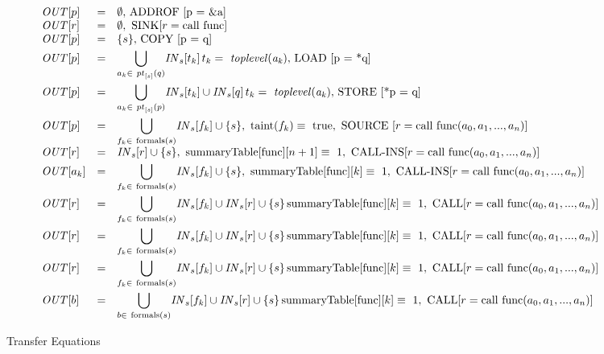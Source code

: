 \begin{figure*}
\[
\begin{array}{lcl}
	\myoutflow[p] & = & \emptyset,\   \addrofdef	\\
		
	\myoutflow[r] & = & \emptyset,\   \sinkdef	\\
			
	\myoutflow[p] & = & \set{s},\   \copydef	\\
				
	\myoutflow[p] & = & \mybigcup{a_k \in\ \pointsto{s}{q}}{} \myinflow{}_s[t_k]\, t_k =\ \mathit{toplevel(a_k)},\   \loaddef	\\		
			
	\myoutflow[p] & = & \mybigcup{a_k \in\ \pointsto{s}{p}}{} \myinflow{}_s[t_k] \cup \myinflow{}_s[q]\, t_k =\ \mathit{toplevel(a_k)},\
	   \storedef	\\
	   
	\myoutflow[p] & = & \mybigcup{f_k \in\ \text{formals}(s)}{} \myinflow{}_s[f_k] \cup \set{s},\ \text{taint}(f_k) \equiv\ 
	\text{true},\   \sourcedef	\\
	
	\myoutflow[r] & = & \myinflow{}_s[r] \cup \set{s},\ \text{summaryTable}[\text{func}][n+1] \equiv\ 1,\	\callinsdef	\\							

	\myoutflow[a_k] & = & \mybigcup{f_k \in\ \text{formals}(s)}{} \myinflow{}_s[f_k] \cup \set{s},\ 
		\text{summaryTable}[\text{func}][k] \equiv\ 1,\	\callinsdef	\\							
	
	\myoutflow[r] & = & \mybigcup{f_k \in\ \text{formals}(s)}{} \myinflow{}_s[f_k] \cup \myinflow{}_s[r] \cup \set{s}\,
	\text{summaryTable}[\text{func}][k] \equiv\ 1,\	\calldef	\\
	
	\myoutflow[r] & = & \mybigcup{f_k \in\ \text{formals}(s)}{} \myinflow{}_s[f_k] \cup \myinflow{}_s[r] \cup \set{s}\,
	\text{summaryTable}[\text{func}][k] \equiv\ 1,\	\calldef	\\
	
	\myoutflow[r] & = & \mybigcup{f_k \in\ \text{formals}(s)}{} \myinflow{}_s[f_k] \cup \myinflow{}_s[r] \cup \set{s}\,
	\text{summaryTable}[\text{func}][k] \equiv\ 1,\	\calldef	\\
	
	\myoutflow[b] & = & \mybigcup{b \in\ \text{formals}(s)}{} \myinflow{}_s[f_k] \cup \myinflow{}_s[r] \cup \set{s}\,
	\text{summaryTable}[\text{func}][k] \equiv\ 1,\	\calldef	\\			
\end{array}
\]
\caption{Transfer Equations}
\end{figure*}

